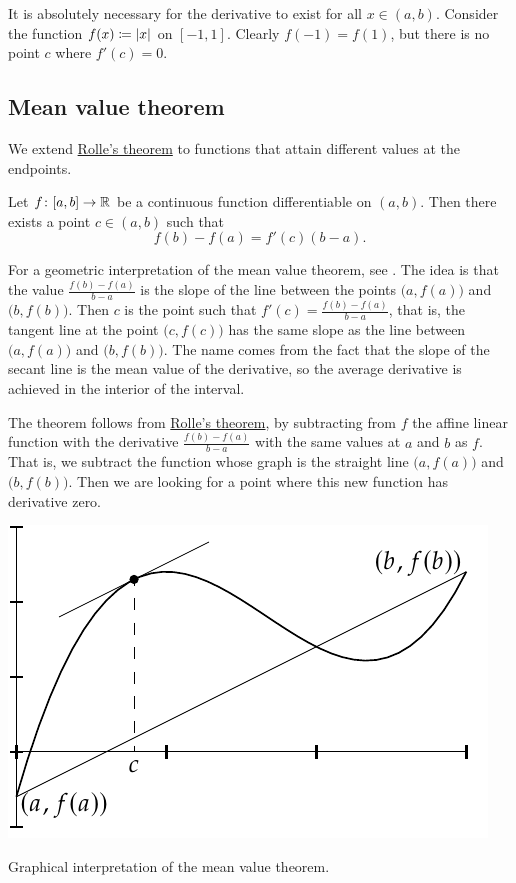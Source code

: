 It is absolutely necessary for the derivative to exist for all $x
\in (a,b)$.  Consider the function $f(x) \coloneqq \left\lvert {x} \right\rvert$ on $[-1,1]$.
Clearly $f(-1) = f(1)$, but there is no point $c$ where $f'(c) = 0$.

\subsection{Mean value theorem}

We extend \hyperref[thm:rolle]{Rolle's theorem}
to functions that attain different
values at the endpoints.

\begin{thm} \label{thm:mvt}
Let $f \colon [a,b] \to {\mathbb{R}}$ be a continuous function
differentiable on $(a,b)$.  Then there exists a point $c \in (a,b)$
such that
\begin{equation*}
f(b)-f(a) = f'(c)(b-a) .
\end{equation*}
\end{thm}

For a geometric interpretation of the mean value theorem, see
.  The idea is that the value $\frac{f(b)-f(a)}{b-a}$
is the slope of the line between the points $\bigl(a,f(a)\bigr)$
and $\bigl(b,f(b)\bigr)$.
Then $c$ is the point such that $f'(c) = \frac{f(b)-f(a)}{b-a}$, that 
is, the tangent line at the point $\bigl(c,f(c)\bigr)$ has the same slope as the
line between $\bigl(a,f(a)\bigr)$ and $\bigl(b,f(b)\bigr)$.
The name comes from the fact that the slope of the secant line
is the mean value of the derivative, so the average derivative is achieved
in the interior of the interval.

The theorem follows from \hyperref[thm:rolle]{Rolle's theorem},
by subtracting from $f$ the affine linear function with the derivative
$\frac{f(b)-f(a)}{b-a}$ with the same values at $a$ and $b$ as $f$.
That is, we subtract the function whose graph is the straight line
$\bigl(a,f(a)\bigr)$ and $\bigl(b,f(b)\bigr)$.
Then we are looking for a point where this new
function has derivative zero.

\begin{myfigureht}
\includegraphics{figures/mvtfig}
\caption{Graphical interpretation of the mean value theorem.\label{mvtfig}}
\end{myfigureht}


